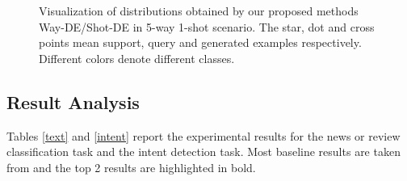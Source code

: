 \documentclass[letterpaper]{article} %
\begin{document}
\begin{figure}[t]
	\centering
	\caption{Visualization of distributions obtained by our proposed methods Way-DE/Shot-DE in 5-way 1-shot scenario. The star, dot and cross points mean support, query and generated examples respectively. Different colors denote different classes.}
	\label{visual}
\end{figure}

\subsection{Result Analysis}
Tables \ref{text} and \ref{intent} report the experimental results for the news or review classification task and the intent detection task. Most baseline results are taken from \cite{ContrastNet} and the top 2 results are highlighted in bold.
\end{document}
